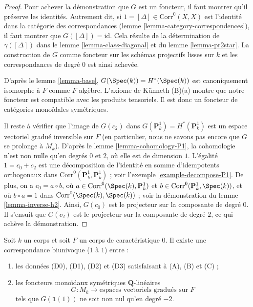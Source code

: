 \begin{proof}
\medskip\noindent
Pour achever la démonstration que $G$ est un foncteur,
il faut montrer qu'il préserve les identités. Autrement dit, si
$1 = [\Delta] \in \text{Corr}^0(X, X)$ est l'identité dans la catégorie
des correspondances (lemme \ref{lemma-category-correspondences}),
il faut montrer que $G([\Delta]) = \text{id}$.
Cela résulte de la détermination
de $\gamma([\Delta])$ dans le lemme \ref{lemma-class-diagonal}
et du lemme \ref{lemma-pr2star}.
La construction de $G$ comme foncteur sur les
schémas projectifs lisses sur $k$ et les correspondances de degré $0$ est ainsi achevée.

\medskip\noindent
D'après le lemme \ref{lemma-base},
$G(\Spec(k)) = H^*(\Spec(k))$ est canoniquement isomorphe à $F$
comme $F$-algèbre. L'axiome de K\"unneth (B)(a)
montre que notre foncteur est compatible avec les produits tensoriels.
Il est donc un foncteur de catégories monoïdales symétriques.

\medskip\noindent
Il reste à vérifier que l'image de $G(c_2)$ dans
$G(\mathbf{P}^1_k) = H^*(\mathbf{P}^1_k)$
est un espace vectoriel gradué inversible sur $F$ (en particulier, nous ne savons pas encore
que $G$ se prolonge à $M_k$). D'après le lemme \ref{lemma-cohomology-P1},
la cohomologie n'est non nulle qu'en degrés $0$ et $2$,
où elle est de dimension $1$. L'égalité $1 = c_0 + c_2$ est une décomposition
de l'identité en somme d'idempotents orthogonaux dans
$\text{Corr}^0(\mathbf{P}^1_k, \mathbf{P}^1_k)$ ; voir
l'exemple \ref{example-decompose-P1}. De plus, on a $c_0 = a \circ b$, où
$a \in \text{Corr}^0(\Spec(k), \mathbf{P}^1_k)$ et
$b \in \text{Corr}^0(\mathbf{P}^1_k, \Spec(k))$, et où
$b \circ a = 1$ dans $\text{Corr}^0(\Spec(k), \Spec(k))$ ; voir la démonstration du
lemme \ref{lemma-inverse-h2}. Ainsi, $G(c_0)$ est le projecteur
sur la composante de degré $0$. Il s'ensuit que $G(c_2)$ est
le projecteur sur la composante de degré $2$, ce qui achève la démonstration.
\end{proof}

\begin{proposition}
\label{proposition-weil-cohomology-theory}
Soit $k$ un corps et soit $F$ un corps de caractéristique $0$. Il existe
une correspondance biunivoque ($1$ à $1$) entre :
\begin{enumerate}
\item les données (D0), (D1), (D2) et (D3) satisfaisant à (A), (B) et (C) ;
\item les foncteurs monoïdaux symétriques $\mathbf{Q}$-linéaires
$$
G : M_k \longrightarrow \text{espaces vectoriels gradués sur }F\text{}
$$
tels que $G(\mathbf{1}(1))$ ne soit non nul qu'en degré $-2$.
\end{enumerate}
\end{proposition}

